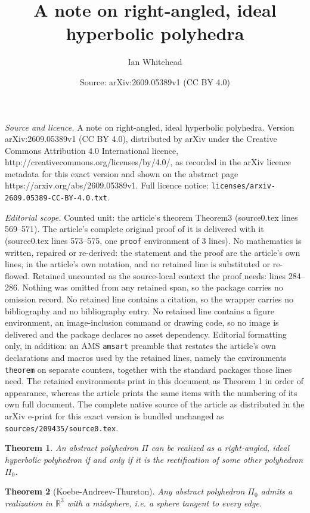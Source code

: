 \documentclass[10pt,a4paper]{amsart}
\title{A note on right-angled, ideal hyperbolic polyhedra}
\author{Ian Whitehead}
\date{Source: arXiv:2609.05389v1 (CC BY 4.0)}
\newtheorem{theorem}{Theorem}
\newcommand{\R}{\mathbb{R}}
\begin{document}
\maketitle

\noindent\emph{Source and licence.} A note on right-angled, ideal hyperbolic polyhedra. Version arXiv:2609.05389v1 (CC BY 4.0), distributed by arXiv under the Creative Commons Attribution 4.0 International licence, http://creativecommons.org/licenses/by/4.0/, as recorded in the arXiv licence metadata for this exact version and shown on the abstract page https://arxiv.org/abs/2609.05389v1. Full licence notice: \texttt{licenses/arxiv-2609.05389-CC-BY-4.0.txt}.\par\smallskip

\noindent\textit{Editorial scope.} Counted unit: the article's theorem Theorem3 (source0.tex lines 569--571). The article's complete original proof of it is delivered with it (source0.tex lines 573--575, one \texttt{proof} environment of 3 lines). No mathematics is written, repaired or re-derived: the statement and the proof are the article's own lines, in the article's own notation, and no retained line is substituted or re-flowed.  Retained uncounted as the source-local context the proof needs: lines 284--286.  Nothing was omitted from any retained span, so the package carries no omission record.  No retained line contains a citation, so the wrapper carries no bibliography and no bibliography entry.  No retained line contains a figure environment, an image-inclusion command or drawing code, so no image is delivered and the package declares no asset dependency.  Editorial formatting only, in addition: an AMS \texttt{amsart} preamble that restates the article's own declarations and macros used by the retained lines, namely the environments \texttt{theorem} on separate counters, together with the standard packages those lines need.  The retained environments print in this document as Theorem 1 in order of appearance, whereas the article prints the same items with the numbering of its own full document.  The complete native source of the article as distributed in the arXiv e-print for this exact version is bundled unchanged as \texttt{sources/209435/source0.tex}.
\begin{theorem} \label{Theorem2}
An abstract polyhedron $\Pi$ can be realized as a right-angled, ideal hyperbolic polyhedron if and only if it is the rectification of some other polyhedron $\Pi_0$. 
\end{theorem}

\begin{theorem}[Koebe-Andreev-Thurston] \label{Theorem3}
Any abstract polyhedron $\Pi_0$ admits a realization in $\R^3$ with a midsphere, i.e. a sphere tangent to every edge.
\end{theorem} 
\end{document}
